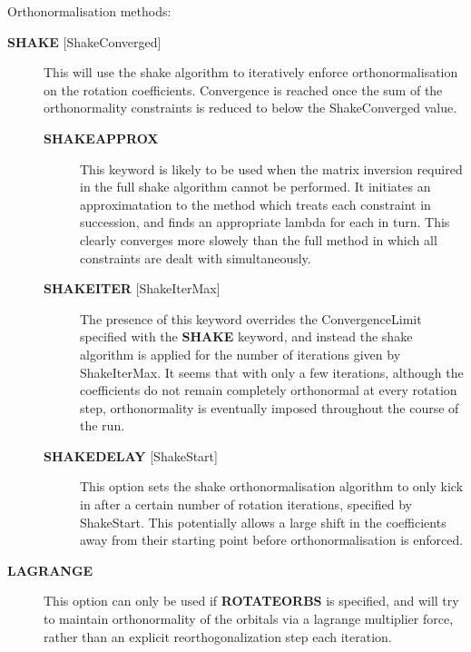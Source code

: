 \documentclass[openany,a4paper,10pt]{manual}
\begin{document}
Orthonormalisation methods:
\begin{description}
\item[\textbf{SHAKE} {[}ShakeConverged{]}]
This will use the shake algorithm to iteratively enforce orthonormalisation on the
rotation coefficients.
Convergence is reached once the sum of the orthonormality constraints is reduced to
below the ShakeConverged value.
\begin{description}
\item[\textbf{SHAKEAPPROX}]
This keyword is likely to be used when the matrix inversion required in the
full shake algorithm cannot be performed.  It initiates an approximatation to the
method which treats each constraint in succession, and finds an appropriate lambda
for each in turn.  This clearly converges more slowely than the full method in which
all constraints are dealt with simultaneously.

\item[\textbf{SHAKEITER} {[}ShakeIterMax{]}]
The presence of this keyword overrides the ConvergenceLimit specified with the \textbf{SHAKE}
keyword, and instead the shake algorithm is applied for the number of iterations given
by ShakeIterMax.  It seems that with only a few iterations, although the coefficients do
not remain completely orthonormal at every rotation step, orthonormality is eventually imposed
throughout the course of the run.

\item[\textbf{SHAKEDELAY} {[}ShakeStart{]}]
This option sets the shake orthonormalisation algorithm to only kick in after a certain number
of rotation iterations, specified by ShakeStart.  This potentially allows a large shift in
the coefficients away from their starting point before orthonormalisation is enforced.

\end{description}

\item[\textbf{LAGRANGE}]
This option can only be used if \textbf{ROTATEORBS} is specified, and will try to
maintain orthonormality of the orbitals via a lagrange multiplier force, rather
than an explicit reorthogonalization step each iteration.

\end{description}
\end{document}

